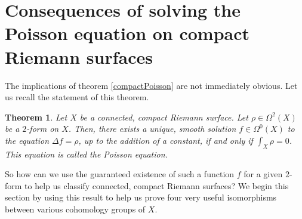 \documentclass[11pt]{report}
\newtheorem*{thm*}{Theorem}
\theoremstyle{definition}
\begin{document}
\section{Consequences of solving the Poisson equation on compact Riemann surfaces}
The implications of theorem \ref{compactPoisson} are not immediately obvious. Let us recall the statement of this theorem.
\begin{thm*}
  Let $X$ be a connected, compact Riemann surface. Let $\rho \in \Omega^2(X)$ be a $2$-form on $X$. Then, there exists a unique, smooth solution $f \in \Omega^0(X)$ to the equation $\Delta f = \rho$, up to the addition of a constant, if and only if $\int_X \rho = 0$. This equation is called the Poisson equation.
\end{thm*}
So how can we use the guaranteed existence of such a function $f$ for a given $2$-form to help us classify connected, compact Riemann surfaces? We begin this section by using this result to help us prove four very useful isomorphisms between various cohomology groups of $X$.
\end{document}
